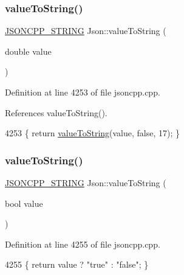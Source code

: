 \subsubsection{\texorpdfstring{value\+To\+String()}{valueToString()}\hspace{0.1cm}{\footnotesize\ttfamily [5/6]}}
{\footnotesize\ttfamily \hyperlink{json_8h_a1e723f95759de062585bc4a8fd3fa4be}{J\+S\+O\+N\+C\+P\+P\+\_\+\+S\+T\+R\+I\+NG} Json\+::value\+To\+String (\begin{DoxyParamCaption}\item[{double}]{value }\end{DoxyParamCaption})}



Definition at line 4253 of file jsoncpp.\+cpp.



References value\+To\+String().


\begin{DoxyCode}
4253 \{ \textcolor{keywordflow}{return} \hyperlink{namespace_json_a498503e8f49d6a3811e3c9f6757da60d}{valueToString}(value, \textcolor{keyword}{false}, 17); \}
\end{DoxyCode}
\mbox{\label{namespace_json_a0a706a1fffba4fe8a8c1ef75b2dbbfab}} 
\subsubsection{\texorpdfstring{value\+To\+String()}{valueToString()}\hspace{0.1cm}{\footnotesize\ttfamily [6/6]}}
{\footnotesize\ttfamily \hyperlink{json_8h_a1e723f95759de062585bc4a8fd3fa4be}{J\+S\+O\+N\+C\+P\+P\+\_\+\+S\+T\+R\+I\+NG} Json\+::value\+To\+String (\begin{DoxyParamCaption}\item[{bool}]{value }\end{DoxyParamCaption})}



Definition at line 4255 of file jsoncpp.\+cpp.


\begin{DoxyCode}
4255 \{ \textcolor{keywordflow}{return} value ? \textcolor{stringliteral}{"true"} : \textcolor{stringliteral}{"false"}; \}
\end{DoxyCode}
\mbox{\label{namespace_json_a00820c0084189e2a7533531c0f250e3f}} 
